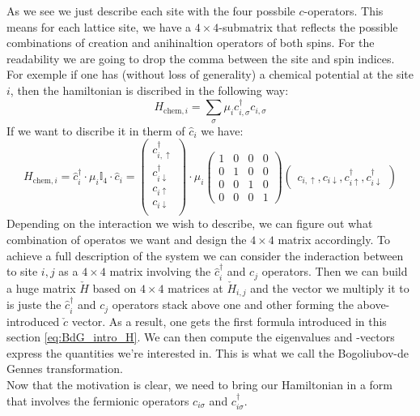\documentclass[../main.tex]{subfile}
\begin{document}
As we see we just describe each site with the four possbile $c$-operators. This means for each lattice site,
we have a $4\times4$-submatrix that reflects the possible combinations of creation and anihinaltion operators of both spins. 
For the readability we are going to drop the comma between the site and spin indices.\\
For exemple if one has (without loss of generality) a chemical potential at the site $i$, 
 then the hamiltonian is discribed in the following way:
\[
    H_{\text{chem},i} = \sum_{\sigma} \mu_i c_{i,\sigma}^{\dagger} c_{i,\sigma}
\]
If we want to discribe it in therm of $\hat{c}_i$ we have:
\[
    H_{\text{chem},i} = \hat{c}_i^{\dagger}\cdot \mu_i \mathbb{I}_4 \cdot\hat{c}_i = \begin{pmatrix}
        c_{i,\uparrow}^{\dagger} \\c_{i\downarrow}^{\dagger}\\ c_{i\uparrow} \\c_{i\downarrow}\\
    \end{pmatrix}\cdot \mu_i
     \begin{pmatrix}
        1 & 0 & 0 & 0\\
        0 & 1 & 0 & 0\\
        0 & 0 & 1 & 0\\
        0 & 0 & 0 & 1
    \end{pmatrix}\begin{pmatrix}c_{i,\uparrow} ,c_{i\downarrow}, c_{i\uparrow}^{\dagger} ,c_{i\downarrow}^{\dagger}\end{pmatrix}
\]
Depending on the interaction we wish to describe, we can figure out what combination of operatos we want and design the $4\times4$ matrix accordingly.
To achieve a full description of the system we can consider the inderaction between to site $i,j$ as a $4\times4$ matrix involving the $\hat{c}_i^{\dagger}$ and $c_j$ operators.
Then we can build a huge matrix $\check{H}$ based on $4\times4$ matrices at $\check{H}_{i,j}$ and the vector we multiply it to is juste the $\hat{c}_i^{\dagger}$ and $c_j$ operators 
stack above one and other forming the above-introduced $\check{c}$ vector. As a result, one gets the first formula introduced in this section \ref{eq:BdG_intro_H}.
We can then compute the eigenvalues and -vectors express the quantities we're interested in. This is what we call the Bogoliubov-de Gennes transformation.\\

Now that the motivation is clear, we need to bring our Hamiltonian in a form that involves the fermionic operators $c_{i\sigma}$ and $c_{i\sigma}^{\dagger}$.
\end{document}
